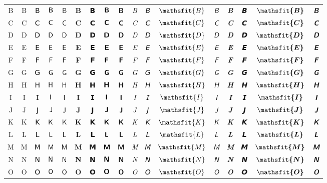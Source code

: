 \documentclass[10pt]{standalone}
\newcommand{\SANS}[1]{\ifmmode\mathsf{#1}\else\textsf{#1}\fi}
\newcommand{\BSANS}[1]{\ifmmode\boldsymbol{\mathsf{#1}}\else\textbf{\textsf{#1}}\fi}
\newcommand{\ISANS}[1]{\ifmmode\mathsfit{#1}\else\textit{\textsf{#1}}\fi}
\newcommand{\BISANS}[1]{\ifmmode\bm{\mathsfit{#1}}\else\textbf{\textsf{\textit{#1}}}\fi}
\begin{document}
\begin{tabular}{c|cc|cc|cc|cc|cc|cc|cc|cc}
B & \SANS{B} & 𝖡 & $\SANS{B}$ & $𝖡$ & \BSANS{B} & 𝗕 & $\BSANS{B}$ & $𝗕$ & \ISANS{B} & 𝘉 & $\ISANS{B}$ & $𝘉$ & \BISANS{B} & 𝘽 & $\BISANS{B}$ & $𝘽$  \\
C & \SANS{C} & 𝖢 & $\SANS{C}$ & $𝖢$ & \BSANS{C} & 𝗖 & $\BSANS{C}$ & $𝗖$ & \ISANS{C} & 𝘊 & $\ISANS{C}$ & $𝘊$ & \BISANS{C} & 𝘾 & $\BISANS{C}$ & $𝘾$  \\
D & \SANS{D} & 𝖣 & $\SANS{D}$ & $𝖣$ & \BSANS{D} & 𝗗 & $\BSANS{D}$ & $𝗗$ & \ISANS{D} & 𝘋 & $\ISANS{D}$ & $𝘋$ & \BISANS{D} & 𝘿 & $\BISANS{D}$ & $𝘿$  \\
E & \SANS{E} & 𝖤 & $\SANS{E}$ & $𝖤$ & \BSANS{E} & 𝗘 & $\BSANS{E}$ & $𝗘$ & \ISANS{E} & 𝘌 & $\ISANS{E}$ & $𝘌$ & \BISANS{E} & 𝙀 & $\BISANS{E}$ & $𝙀$  \\
F & \SANS{F} & 𝖥 & $\SANS{F}$ & $𝖥$ & \BSANS{F} & 𝗙 & $\BSANS{F}$ & $𝗙$ & \ISANS{F} & 𝘍 & $\ISANS{F}$ & $𝘍$ & \BISANS{F} & 𝙁 & $\BISANS{F}$ & $𝙁$  \\
G & \SANS{G} & 𝖦 & $\SANS{G}$ & $𝖦$ & \BSANS{G} & 𝗚 & $\BSANS{G}$ & $𝗚$ & \ISANS{G} & 𝘎 & $\ISANS{G}$ & $𝘎$ & \BISANS{G} & 𝙂 & $\BISANS{G}$ & $𝙂$  \\
H & \SANS{H} & 𝖧 & $\SANS{H}$ & $𝖧$ & \BSANS{H} & 𝗛 & $\BSANS{H}$ & $𝗛$ & \ISANS{H} & 𝘏 & $\ISANS{H}$ & $𝘏$ & \BISANS{H} & 𝙃 & $\BISANS{H}$ & $𝙃$  \\
I & \SANS{I} & 𝖨 & $\SANS{I}$ & $𝖨$ & \BSANS{I} & 𝗜 & $\BSANS{I}$ & $𝗜$ & \ISANS{I} & 𝘐 & $\ISANS{I}$ & $𝘐$ & \BISANS{I} & 𝙄 & $\BISANS{I}$ & $𝙄$  \\
J & \SANS{J} & 𝖩 & $\SANS{J}$ & $𝖩$ & \BSANS{J} & 𝗝 & $\BSANS{J}$ & $𝗝$ & \ISANS{J} & 𝘑 & $\ISANS{J}$ & $𝘑$ & \BISANS{J} & 𝙅 & $\BISANS{J}$ & $𝙅$  \\
K & \SANS{K} & 𝖪 & $\SANS{K}$ & $𝖪$ & \BSANS{K} & 𝗞 & $\BSANS{K}$ & $𝗞$ & \ISANS{K} & 𝘒 & $\ISANS{K}$ & $𝘒$ & \BISANS{K} & 𝙆 & $\BISANS{K}$ & $𝙆$  \\
L & \SANS{L} & 𝖫 & $\SANS{L}$ & $𝖫$ & \BSANS{L} & 𝗟 & $\BSANS{L}$ & $𝗟$ & \ISANS{L} & 𝘓 & $\ISANS{L}$ & $𝘓$ & \BISANS{L} & 𝙇 & $\BISANS{L}$ & $𝙇$  \\
M & \SANS{M} & 𝖬 & $\SANS{M}$ & $𝖬$ & \BSANS{M} & 𝗠 & $\BSANS{M}$ & $𝗠$ & \ISANS{M} & 𝘔 & $\ISANS{M}$ & $𝘔$ & \BISANS{M} & 𝙈 & $\BISANS{M}$ & $𝙈$  \\
N & \SANS{N} & 𝖭 & $\SANS{N}$ & $𝖭$ & \BSANS{N} & 𝗡 & $\BSANS{N}$ & $𝗡$ & \ISANS{N} & 𝘕 & $\ISANS{N}$ & $𝘕$ & \BISANS{N} & 𝙉 & $\BISANS{N}$ & $𝙉$  \\
O & \SANS{O} & 𝖮 & $\SANS{O}$ & $𝖮$ & \BSANS{O} & 𝗢 & $\BSANS{O}$ & $𝗢$ & \ISANS{O} & 𝘖 & $\ISANS{O}$ & $𝘖$ & \BISANS{O} & 𝙊 & $\BISANS{O}$ & $𝙊$  \\

\end{tabular}
\end{document}
